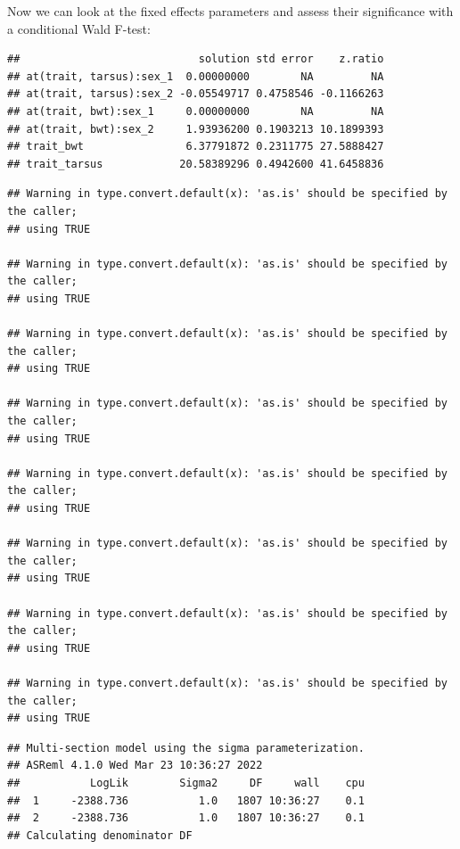 \documentclass[
  12pt,
]{book}
\newenvironment{Shaded}{\begin{snugshade}}{\end{snugshade}}
\newcommand{\DataTypeTok}[1]{\textcolor[rgb]{0.13,0.29,0.53}{#1}}
\newcommand{\KeywordTok}[1]{\textcolor[rgb]{0.13,0.29,0.53}{\textbf{#1}}}
\newcommand{\NormalTok}[1]{#1}
\newcommand{\OperatorTok}[1]{\textcolor[rgb]{0.81,0.36,0.00}{\textbf{#1}}}
\newcommand{\OtherTok}[1]{\textcolor[rgb]{0.56,0.35,0.01}{#1}}
\newcommand{\StringTok}[1]{\textcolor[rgb]{0.31,0.60,0.02}{#1}}
\begin{document}
Now we can look at the fixed effects parameters and assess their significance with a conditional Wald F-test:

\begin{Shaded}
\end{Shaded}

\begin{verbatim}
##                            solution std error    z.ratio
## at(trait, tarsus):sex_1  0.00000000        NA         NA
## at(trait, tarsus):sex_2 -0.05549717 0.4758546 -0.1166263
## at(trait, bwt):sex_1     0.00000000        NA         NA
## at(trait, bwt):sex_2     1.93936200 0.1903213 10.1899393
## trait_bwt                6.37791872 0.2311775 27.5888427
## trait_tarsus            20.58389296 0.4942600 41.6458836
\end{verbatim}

\begin{verbatim}
## Warning in type.convert.default(x): 'as.is' should be specified by the caller;
## using TRUE

## Warning in type.convert.default(x): 'as.is' should be specified by the caller;
## using TRUE

## Warning in type.convert.default(x): 'as.is' should be specified by the caller;
## using TRUE

## Warning in type.convert.default(x): 'as.is' should be specified by the caller;
## using TRUE

## Warning in type.convert.default(x): 'as.is' should be specified by the caller;
## using TRUE

## Warning in type.convert.default(x): 'as.is' should be specified by the caller;
## using TRUE

## Warning in type.convert.default(x): 'as.is' should be specified by the caller;
## using TRUE

## Warning in type.convert.default(x): 'as.is' should be specified by the caller;
## using TRUE
\end{verbatim}

\begin{verbatim}
## Multi-section model using the sigma parameterization.
## ASReml 4.1.0 Wed Mar 23 10:36:27 2022
##           LogLik        Sigma2     DF     wall    cpu
##  1     -2388.736           1.0   1807 10:36:27    0.1
##  2     -2388.736           1.0   1807 10:36:27    0.1
## Calculating denominator DF
\end{verbatim}
\end{document}
